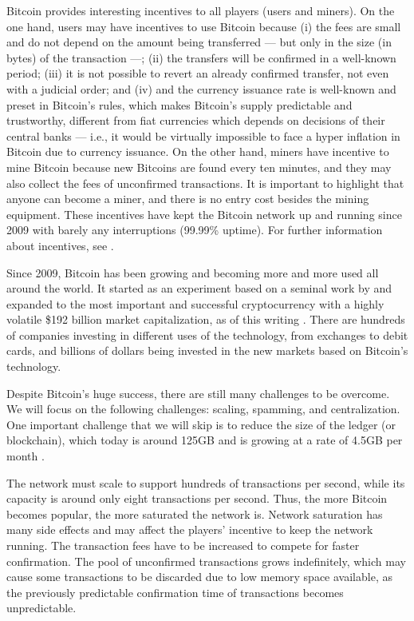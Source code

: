 Bitcoin provides interesting incentives to all players (users and miners). On the one hand, users may have incentives to use Bitcoin because (i) the fees are small and do not depend on the amount being transferred --- but only in the size (in bytes) of the transaction ---; (ii) the transfers will be confirmed in a well-known period; (iii) it is not possible to revert an already confirmed transfer, not even with a judicial order; and (iv) and the currency issuance rate is well-known and preset in Bitcoin's rules, which makes Bitcoin's supply predictable and trustworthy, different from fiat currencies which depends on decisions of their central banks --- i.e., it would be virtually impossible to face a hyper inflation in Bitcoin due to currency issuance. On the other hand, miners have incentive to mine Bitcoin because new Bitcoins are found every ten minutes, and they may also collect the fees of unconfirmed transactions. It is important to highlight that anyone can become a miner, and there is no entry cost besides the mining equipment. These incentives have kept the Bitcoin network up and running since 2009 with barely any interruptions (99.99\% uptime). For further information about incentives, see \citet{ma2018market, catalini2016some}.

Since 2009, Bitcoin has been growing and becoming more and more used all around the world. It started as an experiment based on a seminal work by \citet{nakamoto2008bitcoin} and expanded to the most important and successful cryptocurrency with a highly volatile \$192 billion market capitalization, as of this writing \citep{coinmarketcapbtc}. There are hundreds of companies investing in different uses of the technology, from exchanges to debit cards, and billions of dollars being invested in the new markets based on Bitcoin's technology.

Despite Bitcoin's huge success, there are still many challenges to be overcome. We will focus on the following challenges: scaling, spamming, and centralization. One important challenge that we will skip is to reduce the size of the ledger (or blockchain), which today is around 125GB and is growing at a rate of 4.5GB per month \citep{blockchaininfosize}.

The network must scale to support hundreds of transactions per second, while its capacity is around only eight transactions per second. Thus, the more Bitcoin becomes popular, the more saturated the network is. Network saturation has many side effects and may affect the players' incentive to keep the network running. The transaction fees have to be increased to compete for faster confirmation. The pool of unconfirmed transactions grows indefinitely, which may cause some transactions to be discarded due to low memory space available, as the previously predictable confirmation time of transactions becomes unpredictable.

